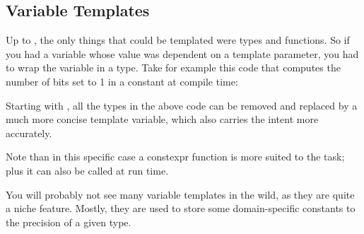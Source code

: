 \subsection{Variable Templates}

\problemtitle

Up to , the only things that could be templated were types and
functions. So if you had a variable whose value was dependent on a
template parameter, you had to wrap the variable in a type. Take for
example this code that computes the number of bits set to 1 in a
constant at compile time:



\solutiontitle

Starting with , all the types in the above code can be removed
and replaced by a much more concise template variable, which also
carries the intent more accurately.



Note than in this specific case a constexpr function
 is more suited to the task; plus it can also be
called at run time.

You will probably not see many variable templates in the wild, as they
are quite a niche feature. Mostly, they are used to store some
domain-specific constants to the precision of a given type.
